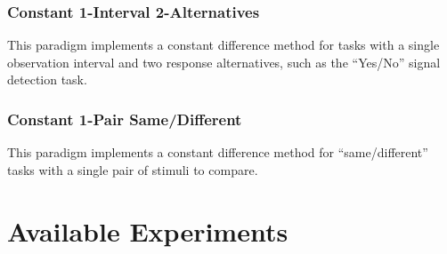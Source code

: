 \subsubsection{Constant 1-Interval 2-Alternatives}
This paradigm implements a constant difference method for tasks with a single observation interval and two response alternatives, such as the ``Yes/No'' signal detection task. 

\subsubsection{Constant 1-Pair Same/Different}
This paradigm implements a constant difference method for ``same/different'' tasks with a single pair of stimuli to compare.

\section{Available Experiments}






